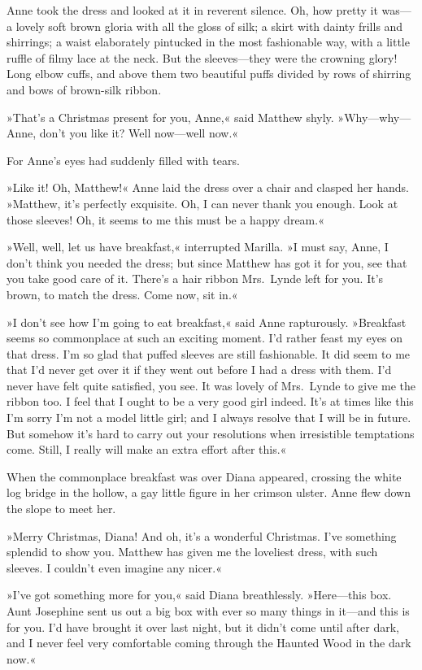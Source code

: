 Anne took the dress and looked at it in reverent silence. Oh, how pretty it was—a lovely soft brown gloria with all the gloss of silk; a skirt with dainty frills and shirrings; a waist elaborately pintucked in the most fashionable way, with a little ruffle of filmy lace at the neck. But the sleeves—they were the crowning glory! Long elbow cuffs, and above them two beautiful puffs divided by rows of shirring and bows of brown-silk ribbon.

»That's a Christmas present for you, Anne,« said Matthew shyly. »Why—why—Anne, don't you like it? Well now—well now.«

For Anne's eyes had suddenly filled with tears.

»Like it! Oh, Matthew!« Anne laid the dress over a chair and clasped her hands. »Matthew, it's perfectly exquisite. Oh, I can never thank you enough. Look at those sleeves! Oh, it seems to me this must be a happy dream.«

»Well, well, let us have breakfast,« interrupted Marilla. »I must say, Anne, I don't think you needed the dress; but since Matthew has got it for you, see that you take good care of it. There's a hair ribbon Mrs.~Lynde left for you. It's brown, to match the dress. Come now, sit in.«

»I don't see how I'm going to eat breakfast,« said Anne rapturously. »Breakfast seems so commonplace at such an exciting moment. I'd rather feast my eyes on that dress. I'm so glad that puffed sleeves are still fashionable. It did seem to me that I'd never get over it if they went out before I had a dress with them. I'd never have felt quite satisfied, you see. It was lovely of Mrs.~Lynde to give me the ribbon too. I feel that I ought to be a very good girl indeed. It's at times like this I'm sorry I'm not a model little girl; and I always resolve that I will be in future. But somehow it's hard to carry out your resolutions when irresistible temptations come. Still, I really will make an extra effort after this.«

When the commonplace breakfast was over Diana appeared, crossing the white log bridge in the hollow, a gay little figure in her crimson ulster. Anne flew down the slope to meet her.

»Merry Christmas, Diana! And oh, it's a wonderful Christmas. I've something splendid to show you. Matthew has given me the loveliest dress, with such sleeves. I couldn't even imagine any nicer.«

»I've got something more for you,« said Diana breathlessly. »Here—this box. Aunt Josephine sent us out a big box with ever so many things in it—and this is for you. I'd have brought it over last night, but it didn't come until after dark, and I never feel very comfortable coming through the Haunted Wood in the dark now.«


